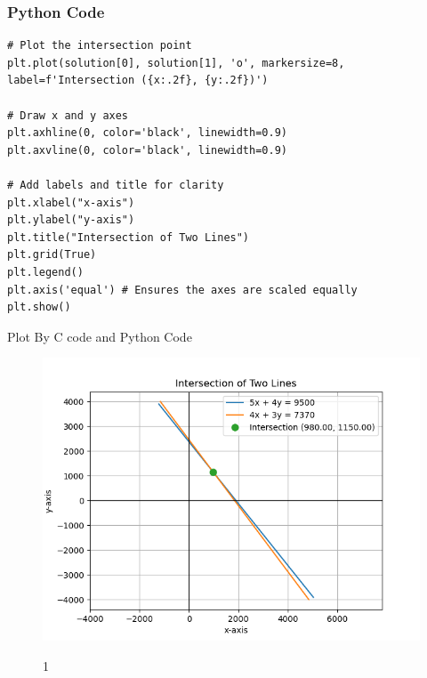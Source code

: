 \documentclass{beamer}
\begin{document}
\begin{frame}[fragile]
\frametitle{Python Code}
\begin{lstlisting}
# Plot the intersection point
plt.plot(solution[0], solution[1], 'o', markersize=8, label=f'Intersection ({x:.2f}, {y:.2f})')

# Draw x and y axes
plt.axhline(0, color='black', linewidth=0.9)
plt.axvline(0, color='black', linewidth=0.9)

# Add labels and title for clarity
plt.xlabel("x-axis")
plt.ylabel("y-axis")
plt.title("Intersection of Two Lines")
plt.grid(True)
plt.legend()
plt.axis('equal') # Ensures the axes are scaled equally
plt.show()
\end{lstlisting}
\end{frame}
\begin{frame}{Plot By C code and Python Code}
    \begin{figure}
    \centering
    \includegraphics[width=0.7\columnwidth]{figs/Figure_1.png}
    \label{fig:placeholder}
    \caption{1}
\end{figure}
\end{frame}
\end{document}
